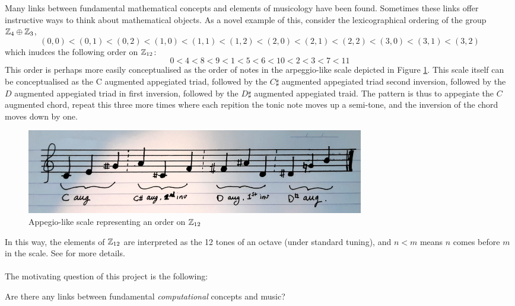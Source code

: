 Many links between fundamental mathematical concepts and elements of musicology have been found. Sometimes these links offer instructive ways to think about mathematical objects. As a novel example of this, consider the lexicographical ordering of the group $\mathbb{Z}_4 \oplus \mathbb{Z}_3$,
\[(0,0) < (0,1) < (0,2) < (1,0) < (1,1) < (1,2) < (2,0) < (2,1) < (2,2) < (3,0)< (3,1) < (3,2)\]
which inudces the following order on $\mathbb{Z}_{12}$:
\begin{equation}
\label{ordering}
0 < 4 < 8 < 9 < 1 < 5 <6 < 10 < 2 < 3 < 7 < 11
\end{equation}
This order is perhaps more easily conceptualised as the order of notes in the arpeggio-like scale depicted in Figure \ref{appegiolike}. This scale itself can be conceptualised as the C augmented appegiated triad, followed by the $C\sharp$ augmented appegiated triad second inversion, followed by the $D$ augmented appegiated triad in first inversion, followed by the $D\sharp$ augmented appegiated traid. The pattern is thus to appegiate the $C$ augmented chord, repeat this three more times where each repition the tonic note moves up a semi-tone, and the inversion of the chord moves down by one.
\begin{figure}[h]
\label{appegiolike}
 \centering
 \includegraphics[width=40em]{Pictures/AppegioLikeScale.png}
 \caption{Appegio-like scale representing an order on $\mathbb{Z}_{12}$}
\end{figure}
In this way, the elements of $\mathbb{Z}_{12}$ are interpreted as the 12 tones of an octave (under standard tuning), and $n < m$ means $n$ comes before $m$ in the scale. See \cite[\S6.8.1]{Mazzola} for more details.\\\\
%
The motivating question of this project is the following:
\begin{question}
 Are there any links between fundamental \emph{computational} concepts and music?
\end{question}

